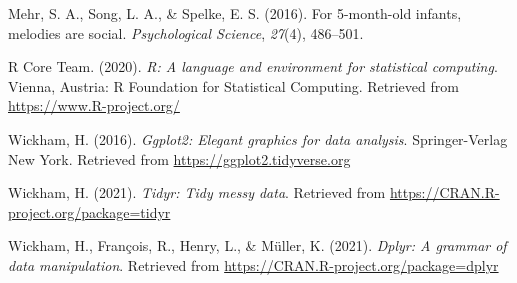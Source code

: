 \documentclass[
  english,
  man]{apa6}
\begin{document}
\leavevmode\hypertarget{ref-mehr2016}{}%
Mehr, S. A., Song, L. A., \& Spelke, E. S. (2016). For 5-month-old infants, melodies are social. \emph{Psychological Science}, \emph{27}(4), 486--501.

\leavevmode\hypertarget{ref-R-base}{}%
R Core Team. (2020). \emph{R: A language and environment for statistical computing}. Vienna, Austria: R Foundation for Statistical Computing. Retrieved from \url{https://www.R-project.org/}

\leavevmode\hypertarget{ref-R-ggplot2}{}%
Wickham, H. (2016). \emph{Ggplot2: Elegant graphics for data analysis}. Springer-Verlag New York. Retrieved from \url{https://ggplot2.tidyverse.org}

\leavevmode\hypertarget{ref-R-tidyr}{}%
Wickham, H. (2021). \emph{Tidyr: Tidy messy data}. Retrieved from \url{https://CRAN.R-project.org/package=tidyr}

\leavevmode\hypertarget{ref-R-dplyr}{}%
Wickham, H., François, R., Henry, L., \& Müller, K. (2021). \emph{Dplyr: A grammar of data manipulation}. Retrieved from \url{https://CRAN.R-project.org/package=dplyr}

\endgroup


\clearpage
\renewcommand{\listfigurename}{Figure captions}
\end{document}
